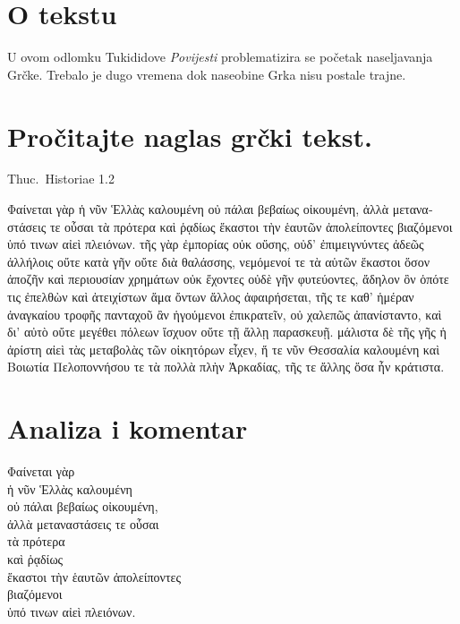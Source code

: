 

\section*{O tekstu}

U ovom odlomku Tukididove \textit{Povijesti} problematizira se početak naseljavanja Grčke. Trebalo je dugo vremena dok naseobine Grka nisu postale trajne.


\section*{Pročitajte naglas grčki tekst.}

Thuc.\ Historiae 1.2


\medskip

\begin{greek}
{\large
{ \noindent Φαίνεται γὰρ ἡ νῦν Ἑλλὰς καλουμένη οὐ πάλαι βεβαίως οἰκουμένη, ἀλλὰ μεταναστάσεις τε οὖσαι τὰ πρότερα καὶ ῥᾳδίως ἕκαστοι τὴν ἑαυτῶν ἀπολείποντες βιαζόμενοι ὑπό τινων αἰεὶ πλειόνων. τῆς γὰρ ἐμπορίας οὐκ οὔσης, οὐδ’ ἐπιμειγνύντες ἀδεῶς ἀλλήλοις οὔτε κατὰ γῆν οὔτε διὰ θαλάσσης, νεμόμενοί τε τὰ αὑτῶν ἕκαστοι ὅσον ἀποζῆν καὶ περιουσίαν χρημάτων οὐκ ἔχοντες οὐδὲ γῆν φυτεύοντες, ἄδηλον ὂν ὁπότε τις ἐπελθὼν καὶ ἀτειχίστων ἅμα ὄντων ἄλλος ἀφαιρήσεται, τῆς τε καθ’ ἡμέραν ἀναγκαίου τροφῆς πανταχοῦ ἂν ἡγούμενοι ἐπικρατεῖν, οὐ χαλεπῶς ἀπανίσταντο, καὶ δι’ αὐτὸ οὔτε μεγέθει πόλεων ἴσχυον οὔτε τῇ ἄλλῃ παρασκευῇ. μάλιστα δὲ τῆς γῆς ἡ ἀρίστη αἰεὶ τὰς μεταβολὰς τῶν οἰκητόρων εἶχεν, ἥ τε νῦν Θεσσαλία καλουμένη καὶ Βοιωτία Πελοποννήσου τε τὰ πολλὰ πλὴν Ἀρκαδίας, τῆς τε ἄλλης ὅσα ἦν κράτιστα.

}
}
\end{greek}

\section*{Analiza i komentar}


{\large
\begin{greek}
\noindent Φαίνεται γὰρ \\
\tabto{2em} ἡ νῦν Ἑλλὰς καλουμένη \\
οὐ πάλαι βεβαίως οἰκουμένη,\\
ἀλλὰ μεταναστάσεις τε οὖσαι \\
\tabto{2em} τὰ πρότερα \\
καὶ ῥᾳδίως \\
\tabto{2em} ἕκαστοι τὴν ἑαυτῶν ἀπολείποντες \\
\tabto{4em} βιαζόμενοι \\
\tabto{6em} ὑπό τινων αἰεὶ πλειόνων.\\

\end{greek}
}

